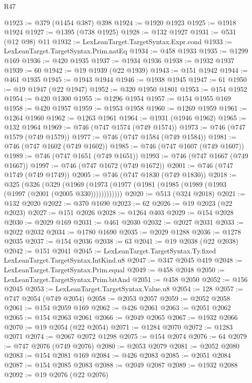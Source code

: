 \begin{lexlean}{R47}
\begin{coremodule}
@1923 := @379 (@1454 @387) @398
@1924 := @1920 @1923
@1925 := @1918 @1924
@1927 := @1395 (@738 @1925)
@1928 := @132 @1927
@1931 := @531 (@12 @98) @11
@1932 := LexLeanTarget.TargetSyntax.Expr.cond
@1933 := LexLeanTarget.TargetSyntax.Prim.natEq
@1934 := @458 @1933
@1935 := @1299 @169
@1936 := @420 @1935
@1937 := @1934 @1936
@1938 := @1932 @1937
@1939 := 60
@1942 := @19 @1939 (@22 @1939)
@1943 := @151 @1942
@1944 := @461 @1935
@1945 := @1943 @1944
@1946 := @1938 @1945
@1947 := 61
@1950 := @19 @1947 (@22 @1947)
@1952 := @320 @1950 @1801
@1953 := @154 @1952
@1954 := @420 @1300
@1955 := @1296 @1954
@1957 := @154 @1955 @169
@1958 := @420 @1957
@1959 := @1953 @1958
@1960 := @1269 @1959
@1961 := @1264 @1960
@1962 := @1263 @1961
@1964 := @1931 (@1946 @1962)
@1965 := @132 @1964
@1969 := @746 (@747 @1574 (@749 @1574))
@1973 := @746 (@747 @1579 (@749 @1579))
@1977 := @746 (@747 @1584 (@749 @1584))
@1981 := @746 (@747 @1602 (@749 @1602))
@1985 := @746 (@747 @1607 (@749 @1607))
@1989 := @746 (@747 @1651 (@749 @1651))
@1993 := @746 (@747 @1667 (@749 @1667))
@1997 := @746 (@747 @1672 (@749 @1672))
@2001 := @746 (@747 @1749 (@749 @1749))
@2005 := @746 (@747 @1830 (@749 @1830))
@2018 := @325
    (@326
      (@329 (@1969 (@1973 (@1977 (@1981 (@1985 (@1989 (@1993 (@1997 (@2001 (@2005 @330))))))))))))
@2020 := @513 (@324 @2018)
@2021 := @132 @2020
@2022 := @370 @1690
@2023 := 62
@2026 := @19 @2023 (@22 @2023)
@2027 := @151 @2026
@2028 := @1264 @403
@2029 := @154 @2028
@2030 := @2029 @169
@2031 := @461 @2030
@2032 := @2027 @2031
@2033 := @2022 @2032
@2034 := @1780 @1690
@2035 := @2029 @1288
@2036 := @1278 @2035
@2037 := @154 @2036
@2038 := 63
@2041 := @19 @2038 (@22 @2038)
@2042 := @151 @2041
@2045 := LexLeanTarget.TargetSyntax.Ty.fixed LexLeanTarget.TargetSyntax.IntKind.u8
@2047 := @347 @2045 @419
@2048 := LexLeanTarget.TargetSyntax.Prim.equal
@2049 := @458 @2048
@2050 := LexLeanTarget.TargetSyntax.Prim.bitAnd
@2051 := @458 @2050
@2052 := @156 @2045
@2053 := LexLeanTarget.TargetSyntax.Value.u8
@2054 := 128
@2057 := @747 @2054 (@749 @2054)
@2058 := @2053 @2057
@2059 := @2052 @2058
@2061 := @154 @2059 @169
@2062 := @426 @2061
@2063 := @2051 @2062
@2065 := @154 @2063 @2061
@2066 := @2049 @2065
@2067 := @1932 @2066
@2070 := @19 @2054 (@22 @2054)
@2071 := @1284 @2070
@2072 := @1283 @2071
@2074 := @2067 @2072 @1298
@2075 := @154 @2074
@2076 := 64
@2079 := @747 @2076 (@749 @2076)
@2080 := @2053 @2079
@2081 := @2052 @2080
@2083 := @154 @2081 @169
@2084 := @426 @2083
@2085 := @2051 @2084
@2087 := @154 @2085 @2083
@2088 := @2049 @2087
@2089 := @1932 @2088
@2092 := @19 @2076 (@22 @2076)

\end{coremodule}
\end{lexlean}

